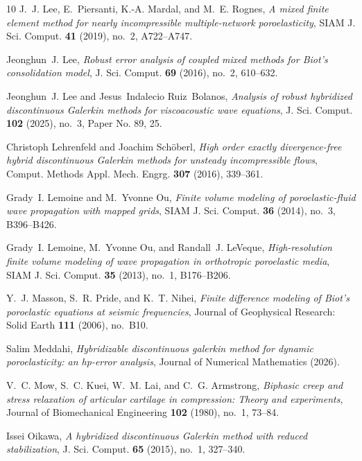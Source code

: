 \documentclass[10pt,letterpaper]{amsart}
\theoremstyle{plain} %
\theoremstyle{remark} %
\begin{document}
\begin{thebibliography}{10}
J.~J. Lee, E.~Piersanti, K.-A. Mardal, and M.~E. Rognes, \emph{A mixed finite
  element method for nearly incompressible multiple-network poroelasticity},
  SIAM J. Sci. Comput. \textbf{41} (2019), no.~2, A722--A747. 

Jeonghun~J. Lee, \emph{Robust error analysis of coupled mixed methods for
  {B}iot's consolidation model}, J. Sci. Comput. \textbf{69} (2016), no.~2,
  610--632. 

Jeonghun~J. Lee and Jesus~Indalecio Ruiz~Bolanos, \emph{Analysis of robust
  hybridized discontinuous {G}alerkin methods for viscoacoustic wave
  equations}, J. Sci. Comput. \textbf{102} (2025), no.~3, Paper No. 89, 25.

Christoph Lehrenfeld and Joachim Sch\"oberl, \emph{High order exactly
  divergence-free hybrid discontinuous {G}alerkin methods for unsteady
  incompressible flows}, Comput. Methods Appl. Mech. Engrg. \textbf{307}
  (2016), 339--361. 

Grady~I. Lemoine and M.~Yvonne Ou, \emph{Finite volume modeling of
  poroelastic-fluid wave propagation with mapped grids}, SIAM J. Sci. Comput.
  \textbf{36} (2014), no.~3, B396--B426. 

Grady~I. Lemoine, M.~Yvonne Ou, and Randall~J. LeVeque, \emph{High-resolution
  finite volume modeling of wave propagation in orthotropic poroelastic media},
  SIAM J. Sci. Comput. \textbf{35} (2013), no.~1, B176--B206. 

Y.~J. Masson, S.~R. Pride, and K.~T. Nihei, \emph{Finite difference modeling of
  {B}iot's poroelastic equations at seismic frequencies}, Journal of
  Geophysical Research: Solid Earth \textbf{111} (2006), no.~B10.

Salim Meddahi, \emph{Hybridizable discontinuous galerkin method for dynamic
  poroelasticity: an hp-error analysis}, Journal of Numerical Mathematics
  (2026).

V.~C. Mow, S.~C. Kuei, W.~M. Lai, and C.~G. Armstrong, \emph{Biphasic creep and
  stress relaxation of articular cartilage in compression: Theory and
  experiments}, Journal of Biomechanical Engineering \textbf{102} (1980),
  no.~1, 73--84.

Issei Oikawa, \emph{A hybridized discontinuous {G}alerkin method with reduced
  stabilization}, J. Sci. Comput. \textbf{65} (2015), no.~1, 327--340.


\end{thebibliography}
\end{document}
